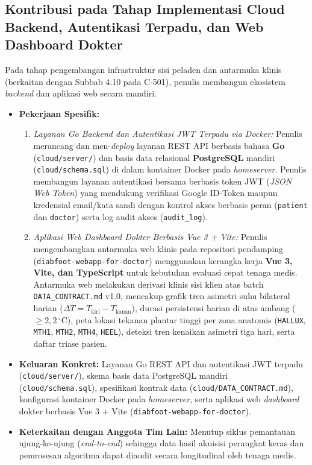 \subsection{Kontribusi pada Tahap Implementasi Cloud Backend, Autentikasi Terpadu, dan Web Dashboard Dokter}
\label{subsec:kontribusi_tahap4}

Pada tahap pengembangan infrastruktur sisi peladen dan antarmuka klinis (berkaitan dengan Subbab 4.10 pada C-501), penulis membangun ekosistem \textit{backend} dan aplikasi web secara mandiri.

\begin{itemize}
    \item \textbf{Pekerjaan Spesifik:}
    \begin{enumerate}
        \item \textit{Layanan Go Backend dan Autentikasi JWT Terpadu via Docker:} Penulis merancang dan men-\textit{deploy} layanan REST API berbasis bahasa \textbf{Go} (\texttt{cloud/server/}) dan basis data relasional \textbf{PostgreSQL} mandiri (\texttt{cloud/schema.sql}) di dalam kontainer Docker pada \textit{homeserver}. Penulis membangun layanan autentikasi bersama berbasis token JWT (\textit{JSON Web Token}) yang mendukung verifikasi Google ID-Token maupun kredensial email/kata sandi dengan kontrol akses berbasis peran (\texttt{patient} dan \texttt{doctor}) serta log audit akses (\texttt{audit\_log}).
        \item \textit{Aplikasi Web Dashboard Dokter Berbasis Vue 3 + Vite:} Penulis mengembangkan antarmuka web klinis pada repositori pendamping (\texttt{diabfoot-webapp-for-doctor}) menggunakan kerangka kerja \textbf{Vue 3, Vite, dan TypeScript} untuk kebutuhan evaluasi cepat tenaga medis. Antarmuka web melakukan derivasi klinis sisi klien atas batch \texttt{DATA\_CONTRACT.md} v1.0, mencakup grafik tren asimetri suhu bilateral harian ($\Delta T = T_{\text{kiri}} - T_{\text{kanan}}$), durasi persistensi harian di atas ambang ($\ge 2{,}2\,^\circ\mathrm{C}$), peta lokasi tekanan plantar tinggi per zona anatomis (\texttt{HALLUX}, \texttt{MTH1}, \texttt{MTH2}, \texttt{MTH4}, \texttt{HEEL}), deteksi tren kenaikan asimetri tiga hari, serta daftar triase pasien.
    \end{enumerate}
    \item \textbf{Keluaran Konkret:} Layanan Go REST API dan autentikasi JWT terpadu (\texttt{cloud/server/}), skema basis data PostgreSQL mandiri (\texttt{cloud/schema.sql}), spesifikasi kontrak data (\texttt{cloud/DATA\_CONTRACT.md}), konfigurasi kontainer Docker pada \textit{homeserver}, serta aplikasi web \textit{dashboard} dokter berbasis Vue 3 + Vite (\texttt{diabfoot-webapp-for-doctor}).
    \item \textbf{Keterkaitan dengan Anggota Tim Lain:} Menutup siklus pemantauan ujung-ke-ujung (\textit{end-to-end}) sehingga data hasil akuisisi perangkat keras dan pemrosesan algoritma dapat diaudit secara longitudinal oleh tenaga medis.
\end{itemize}

